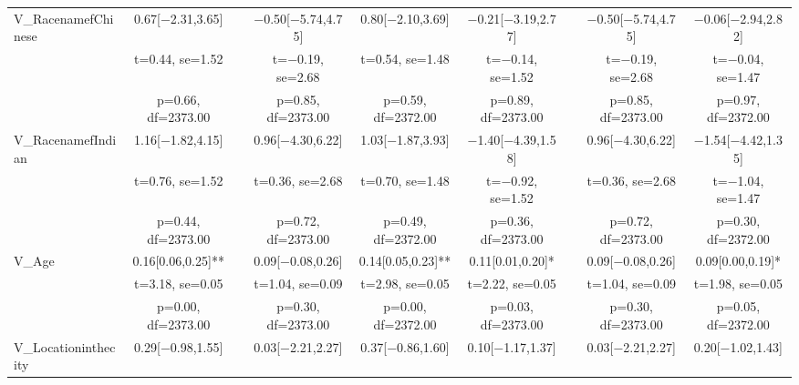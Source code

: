\documentclass[]{report}
\begin{document}
\begin{table}
{\begin{tabular}[t]{lcccccccc}
		V\_RacenamefChinese & \num{0.67}[\num{-2.31},\num{3.65}] &  & \num{-0.50}[\num{-5.74},\num{4.75}] & \num{0.80}[\num{-2.10},\num{3.69}] & \num{-0.21}[\num{-3.19},\num{2.77}] &  & \num{-0.50}[\num{-5.74},\num{4.75}] & \num{-0.06}[\num{-2.94},\num{2.82}]\\
		& t=\num{0.44}, se=\num{1.52} &  & t=\num{-0.19}, se=\num{2.68} & t=\num{0.54}, se=\num{1.48} & t=\num{-0.14}, se=\num{1.52} &  & t=\num{-0.19}, se=\num{2.68} & t=\num{-0.04}, se=\num{1.47}\\
		& p=\num{0.66}, df=\num{2373.00} &  & p=\num{0.85}, df=\num{2373.00} & p=\num{0.59}, df=\num{2372.00} & p=\num{0.89}, df=\num{2373.00} &  & p=\num{0.85}, df=\num{2373.00} & p=\num{0.97}, df=\num{2372.00}\\
		V\_RacenamefIndian & \num{1.16}[\num{-1.82},\num{4.15}] &  & \num{0.96}[\num{-4.30},\num{6.22}] & \num{1.03}[\num{-1.87},\num{3.93}] & \num{-1.40}[\num{-4.39},\num{1.58}] &  & \num{0.96}[\num{-4.30},\num{6.22}] & \num{-1.54}[\num{-4.42},\num{1.35}]\\
		& t=\num{0.76}, se=\num{1.52} &  & t=\num{0.36}, se=\num{2.68} & t=\num{0.70}, se=\num{1.48} & t=\num{-0.92}, se=\num{1.52} &  & t=\num{0.36}, se=\num{2.68} & t=\num{-1.04}, se=\num{1.47}\\
		& p=\num{0.44}, df=\num{2373.00} &  & p=\num{0.72}, df=\num{2373.00} & p=\num{0.49}, df=\num{2372.00} & p=\num{0.36}, df=\num{2373.00} &  & p=\num{0.72}, df=\num{2373.00} & p=\num{0.30}, df=\num{2372.00}\\ \hline
		V\_Age & \num{0.16}[\num{0.06},\num{0.25}]** &  & \num{0.09}[\num{-0.08},\num{0.26}] & \num{0.14}[\num{0.05},\num{0.23}]** & \num{0.11}[\num{0.01},\num{0.20}]* &  & \num{0.09}[\num{-0.08},\num{0.26}] & \num{0.09}[\num{0.00},\num{0.19}]*\\
		& t=\num{3.18}, se=\num{0.05} &  & t=\num{1.04}, se=\num{0.09} & t=\num{2.98}, se=\num{0.05} & t=\num{2.22}, se=\num{0.05} &  & t=\num{1.04}, se=\num{0.09} & t=\num{1.98}, se=\num{0.05}\\
		& p=\num{0.00}, df=\num{2373.00} &  & p=\num{0.30}, df=\num{2373.00} & p=\num{0.00}, df=\num{2372.00} & p=\num{0.03}, df=\num{2373.00} &  & p=\num{0.30}, df=\num{2373.00} & p=\num{0.05}, df=\num{2372.00}\\
		V\_Locationinthecity & \num{0.29}[\num{-0.98},\num{1.55}] &  & \num{0.03}[\num{-2.21},\num{2.27}] & \num{0.37}[\num{-0.86},\num{1.60}] & \num{0.10}[\num{-1.17},\num{1.37}] &  & \num{0.03}[\num{-2.21},\num{2.27}] & \num{0.20}[\num{-1.02},\num{1.43}]\\

\end{tabular}}
\end{table}
\end{document}
